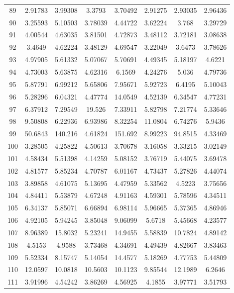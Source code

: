 \begin{center}
\begin{longtable}{cccccccc}
89 & 2.91783 & 3.99308 & 3.3793 & 3.70492 & 2.91275 & 2.93035 & 2.96436\\
90 & 3.25593 & 5.10503 & 3.78039 & 4.44722 & 3.62224 & 3.768 & 3.29729\\
91 & 4.00544 & 4.63035 & 3.81501 & 4.72873 & 3.48112 & 3.72181 & 3.08638\\
92 & 3.4649 & 4.62224 & 3.48129 & 4.69547 & 3.22049 & 3.6473 & 3.78626\\
93 & 4.97905 & 5.61332 & 5.07067 & 5.70691 & 4.49345 & 5.18197 & 4.6221\\
94 & 4.73003 & 5.63875 & 4.62316 & 6.1569 & 4.24276 & 5.036 & 4.79736\\
95 & 5.87791 & 6.99212 & 5.65806 & 7.95671 & 5.92723 & 6.4195 & 5.10043\\
96 & 5.28296 & 6.04321 & 4.47774 & 14.0549 & 4.52139 & 6.34547 & 4.77231\\
97 & 6.37912 & 7.29549 & 19.526 & 7.33911 & 5.82798 & 7.21774 & 5.33646\\
98 & 9.50808 & 6.22936 & 6.93986 & 8.32254 & 11.0804 & 6.74276 & 5.9436\\
99 & 50.6843 & 140.216 & 4.61824 & 151.692 & 8.99223 & 94.8515 & 4.33469\\
100 & 3.28505 & 4.25822 & 4.50613 & 3.70678 & 3.16058 & 3.33215 & 3.02149\\
101 & 4.58434 & 5.51398 & 4.14259 & 5.08152 & 3.76719 & 5.44075 & 3.69478\\
102 & 4.81577 & 5.85234 & 4.70787 & 6.01167 & 4.73437 & 5.27826 & 4.44074\\
103 & 3.89858 & 4.61075 & 5.13695 & 4.47959 & 5.33562 & 4.5223 & 3.75656\\
104 & 4.84411 & 5.53879 & 4.67248 & 4.91163 & 4.59301 & 5.78596 & 4.34511\\
105 & 6.34137 & 5.85071 & 6.66894 & 6.98114 & 5.96665 & 5.37365 & 4.86946\\
106 & 4.92105 & 5.94245 & 3.85048 & 9.06099 & 5.6718 & 5.45668 & 4.23577\\
107 & 8.96389 & 15.8032 & 5.23241 & 14.9455 & 5.58839 & 10.7824 & 4.89142\\
108 & 4.5153 & 4.9588 & 3.73468 & 4.34691 & 4.49439 & 4.82667 & 3.83463\\
109 & 5.52334 & 8.15747 & 5.14054 & 14.4577 & 5.18269 & 4.77753 & 5.44809\\
110 & 12.0597 & 10.0818 & 10.5603 & 10.1123 & 9.85544 & 12.1989 & 6.2646\\
111 & 3.91996 & 4.54242 & 3.86269 & 4.56925 & 4.1855 & 3.97771 & 3.51793\\

\end{longtable}
\end{center}
